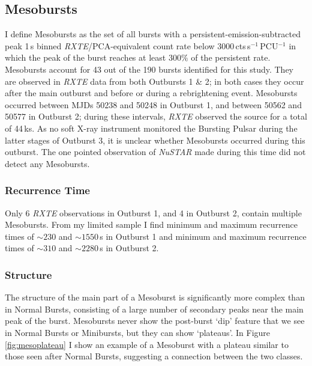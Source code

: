 \subsection{Mesobursts}

\par I define Mesobursts as the set of all bursts with a persistent-emission-subtracted peak 1\,s binned \indexpca\textit{RXTE}/PCA-equivalent count rate below 3000\,cts\,s$^{-1}$\,PCU$^{-1}$ in which the peak of the burst reaches at least $300\%$ of the persistent rate.  Mesobursts account for 43 out of the 190 bursts identified for this study.  They are observed in \indexrxte\textit{RXTE} data from both Outbursts 1 \& 2; in both cases they occur after the main outburst and before or during a rebrightening event.  Mesobursts occurred between MJDs 50238 and 50248 in Outburst 1, and between 50562 and 50577 in Outburst 2; during these intervals, \textit{RXTE} observed the source for a total of 44\,ks.  As no soft X-ray instrument monitored the Bursting Pulsar during the latter stages of Outburst 3, it is unclear whether Mesobursts occurred during this outburst.  The one pointed observation of \indexnustar\textit{NuSTAR} made during this time did not detect any Mesobursts.

\subsubsection{Recurrence Time}

\par Only 6 \indexrxte\textit{RXTE} observations in Outburst 1, and 4 in Outburst 2, contain multiple Mesobursts.  From my limited sample I find minimum and maximum recurrence times of $\sim230$ and $\sim1550$\,s in Outburst 1 and minimum and maximum recurrence times of $\sim310$ and $\sim2280$\,s in Outburst 2.

\subsubsection{Structure}

\par The structure of the main part of a Mesoburst is significantly more complex than in Normal Bursts, consisting of a large number of secondary peaks near the main peak of the burst.  Mesobursts never show the post-burst `dip' feature that we see in Normal Bursts or Minibursts, but they can show `plateaus'.  In Figure \ref{fig:mesoplateau} I show an example of a Mesoburst with a plateau similar to those seen after Normal Bursts, suggesting a connection between the two classes.

